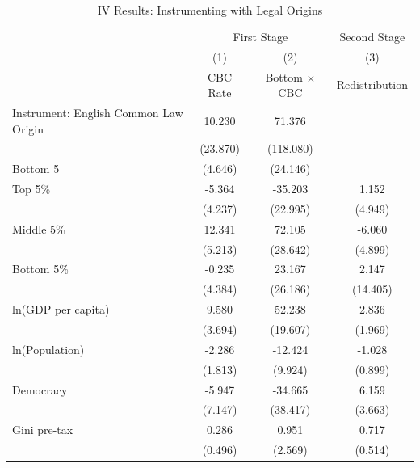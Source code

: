\begin{table}[htbp]\centering
\caption{IV Results: Instrumenting with Legal Origins}
\begin{tabular}{l*{3}{c}}
\toprule
                    &\multicolumn{2}{c}{First Stage}&\multicolumn{1}{c}{Second Stage}\\
                    &\multicolumn{1}{c}{(1)}&\multicolumn{1}{c}{(2)}&\multicolumn{1}{c}{(3)}\\
                    &\multicolumn{1}{c}{CBC Rate}&\multicolumn{1}{c}{Bottom $\times$ CBC}&\multicolumn{1}{c}{Redistribution}\\
\midrule
Instrument: English Common Law Origin&      10.230&      71.376&            \\
                    &    (23.870)&   (118.080)&            \\
\addlinespace
Bottom 5%
                    &     (4.646)&    (24.146)&            \\
\addlinespace
Top 5\%             &      -5.364&     -35.203&       1.152\\
                    &     (4.237)&    (22.995)&     (4.949)\\
\addlinespace
Middle 5\%          &      12.341&      72.105&      -6.060\\
                    &     (5.213)&    (28.642)&     (4.899)\\
\addlinespace
Bottom 5\%          &      -0.235&      23.167&       2.147\\
                    &     (4.384)&    (26.186)&    (14.405)\\
\addlinespace
ln(GDP per capita)  &       9.580&      52.238&       2.836\\
                    &     (3.694)&    (19.607)&     (1.969)\\
\addlinespace
ln(Population)      &      -2.286&     -12.424&      -1.028\\
                    &     (1.813)&     (9.924)&     (0.899)\\
\addlinespace
Democracy           &      -5.947&     -34.665&       6.159\\
                    &     (7.147)&    (38.417)&     (3.663)\\
\addlinespace
Gini pre-tax        &       0.286&       0.951&       0.717\\
                    &     (0.496)&     (2.569)&     (0.514)\\

\end{tabular}
\end{table}
